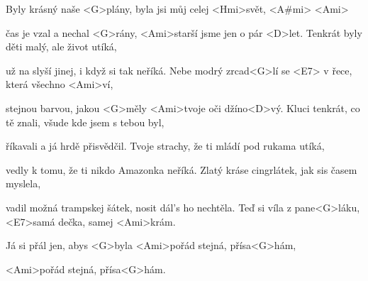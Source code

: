 
\zs
Byly krásný naše <G>plány,
byla jsi můj celej <Hmi>svět, <A#mi> <Ami>

čas je vzal a nechal <G>rány,
<Ami>starší jsme jen o pár <D>let.
\ks
\zs
Tenkrát byly děti malý, ale život utíká,

už na  slyší jinej, i když si tak neříká.
\ks
\zr
Nebe modrý zrcad<G>lí se <E7> v řece, která všechno <Ami>ví,

stejnou barvou, jakou <G>měly <Ami>tvoje oči džíno<D>vý.
\kr
\zs
Kluci tenkrát, co tě znali, všude kde jsem s tebou byl,

 říkavali a já hrdě přisvědčil.
\ks
\zs
Tvoje strachy, že ti mládí pod rukama utíká,

vedly k tomu, že ti nikdo Amazonka neříká.
\ks
\zr \kr
\zs
Zlatý kráse cingrlátek,
jak sis časem myslela,

vadil možná trampskej šátek,
nosit dál's ho nechtěla.
\ks
\zs
Teď si víla z pane<G>láku, <E7>samá dečka, samej <Ami>krám.

Já si přál jen, abys <G>byla <Ami>pořád stejná, přísa<G>hám,

<Ami>pořád stejná, přísa<G>hám.
\ks
\zr \kr
\kp
